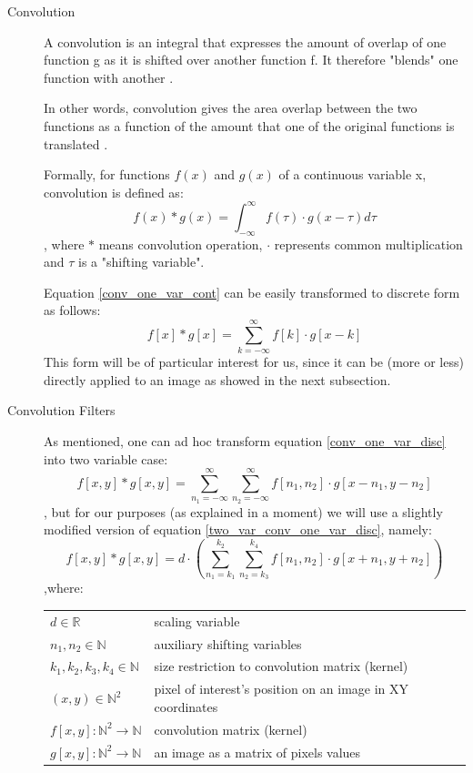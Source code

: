\documentclass{article}
\makeatletter
\newenvironment{conditions}
  {\par\vspace{\abovedisplayskip}\noindent\begin{tabular}{>{$}l<{$} @{${}\equiv{}$} l}}
  {\end{tabular}\par\vspace{\belowdisplayskip}}
\makeatother
\begin{document}
\begin{description}

%
%
\item[Convolution]
A convolution is an integral that expresses the amount of overlap of one function g as it is shifted over another function f. It therefore "blends" one function with another  \cite{convolution_wolphram}. 

In other words, convolution gives the area overlap between the two functions as a function of the amount that one of the original functions is translated \cite{convolution_wiki}.

Formally, for functions $f(x)$ and $g(x)$ of a continuous variable x, convolution is defined as:
\begin{equation} \label{conv_one_var_cont}
f(x) * g(x) = \int_{-\infty}^{\infty} f(\tau) \cdot g(x - \tau) d\tau
\end{equation}
, where $*$ means convolution operation, $\cdot$ represents common multiplication and $\tau$ is a "shifting variable".

Equation \ref{conv_one_var_cont} can be easily transformed to discrete form as follows:
\begin{equation} \label{conv_one_var_disc}
f[x] * g[x] = \sum_{k=-\infty}^{\infty} f[k] \cdot g[x-k]
\end{equation}
This form will be of particular interest for us, since it can be (more or less) directly applied to an image as showed in the next subsection.

%
%
\item[Convolution Filters]
As mentioned, one can ad hoc transform equation \ref{conv_one_var_disc} into two variable case:
\begin{equation} \label{two_var_conv_one_var_disc}
f[x,y] * g[x,y] =\sum_{n_{1}=-\infty}^{\infty} \sum_{n_{2}=-\infty}^{\infty} f[n_{1}, n_{2}] \cdot g[x-n_{1}, y - n_{2}]
\end{equation}
, but for our purposes (as explained in a moment) we will use a slightly modified version of equation \ref{two_var_conv_one_var_disc}, namely:
\begin{equation} \label{final_two_var_conv_one_var_disc}
f[x,y] * g[x,y] = d \cdot (\sum_{n_{1}=k_{1}}^{k_{2}} \sum_{n_{2}=k_{3}}^{k_{4}} f[n_{1}, n_{2}] \cdot g[x+n_{1}, y + n_{2}])
\end{equation}
,where:
\begin{conditions} 
  d \in \mathbb{R} & scaling variable\\
  n_{1}, n_{2} \in \mathbb{N}& auxiliary shifting variables\\
  k_{1}, k_{2}, k_{3}, k_{4} \in \mathbb{N}& size restriction to convolution matrix (kernel)\\
 (x,y) \in \mathbb{N}^{2}     &  pixel of interest's position on an image in XY coordinates \\   
 f[x,y] : \mathbb{N}^{2} \rightarrow \mathbb{N} &  convolution matrix (kernel) \\
 g[x,y] : \mathbb{N}^{2} \rightarrow \mathbb{N} & an image as a matrix of pixels values
\end{conditions}


\end{description}
\end{document}
